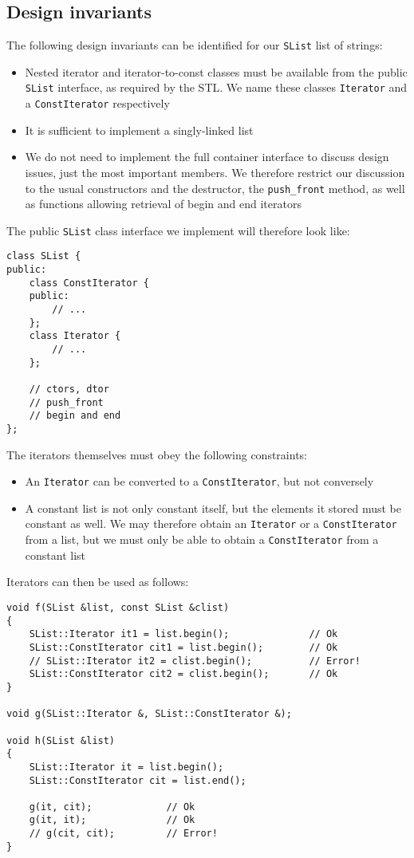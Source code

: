 \subsection{Design invariants}
The following design invariants can be identified for our \lstinline!SList! list of strings:
\begin{itemize}
\item Nested iterator and iterator-to-const classes must be available from the public \lstinline!SList! interface, as required by the STL. We name these classes \lstinline!Iterator! and a \lstinline!ConstIterator! respectively
\item It is sufficient to implement a singly-linked list
\item We do not need to implement the full container interface to discuss design issues, just the most important members. We therefore restrict our discussion to the usual constructors and the destructor, the \lstinline!push_front! method, as well as functions allowing retrieval of begin and end iterators
\end{itemize}
The public \lstinline!SList! class interface we implement will therefore look like:
\begin{lstlisting}[frame=single]
class SList {
public:
    class ConstIterator {
    public:
        // ...
    };
    class Iterator {
        // ...
    };
    
    // ctors, dtor
    // push_front
    // begin and end
};
\end{lstlisting}

The iterators themselves must obey the following constraints:
\begin{itemize}
\item An \lstinline!Iterator! can be converted to a \lstinline!ConstIterator!, but not conversely
\item A constant list is not only constant itself, but the elements it stored must be constant as well. We may therefore obtain an \lstinline!Iterator! or a \lstinline!ConstIterator! from a list, but we must only be able to obtain a \lstinline!ConstIterator! from a constant list
\end{itemize}
Iterators can then be used as follows:
\begin{lstlisting}[frame=single]
void f(SList &list, const SList &clist)
{
    SList::Iterator it1 = list.begin();              // Ok
    SList::ConstIterator cit1 = list.begin();        // Ok
    // SList::Iterator it2 = clist.begin();          // Error!
    SList::ConstIterator cit2 = clist.begin();       // Ok
}

void g(SList::Iterator &, SList::ConstIterator &);

void h(SList &list)
{
    SList::Iterator it = list.begin();
    SList::ConstIterator cit = list.end();
    
    g(it, cit);             // Ok
    g(it, it);              // Ok
    // g(cit, cit);         // Error!
}
\end{lstlisting}

